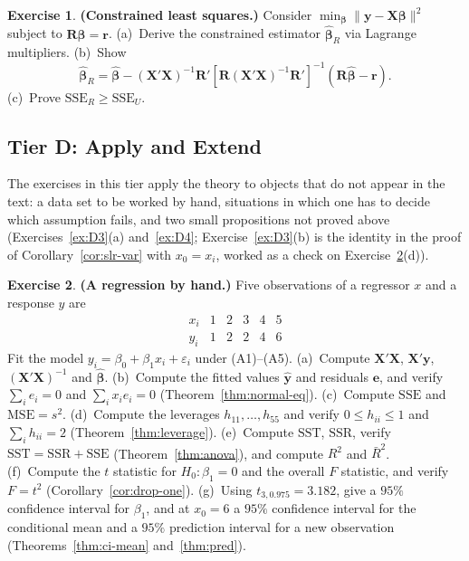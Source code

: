 \documentclass[12pt,a4paper]{article}
\theoremstyle{definition}
\newtheorem{exercise}{Exercise}
\newcommand{\extier}{}
\newcommand{\exercisetier}[1]{\renewcommand{\extier}{#1}\setcounter{exercise}{0}}
\newcommand{\SST}{\mathrm{SST}}
\newcommand{\SSR}{\mathrm{SSR}}
\newcommand{\SSE}{\mathrm{SSE}}
\newcommand{\MSE}{\mathrm{MSE}}
\newcommand{\bX}{\mathbf{X}}
\newcommand{\by}{\mathbf{y}}
\def\bb{\boldsymbol{\beta}}
\newcommand{\bR}{\mathbf{R}}
\newcommand{\br}{\mathbf{r}}
\begin{document}
\begin{exercise}\label{ex:C4}
\textbf{(Constrained least squares.)} Consider $\min_{\bb}\|\by - \bX\bb\|^2$ subject to $\bR\bb = \br$. (a)~Derive the constrained estimator $\hat{\bb}_R$ via Lagrange multipliers. (b)~Show
\[
\hat{\bb}_R = \hat{\bb} - (\bX'\bX)^{-1}\bR'[\bR(\bX'\bX)^{-1}\bR']^{-1}(\bR\hat{\bb} - \br).
\]
(c)~Prove $\SSE_R \geqslant \SSE_U$.
\end{exercise}

\exercisetier{D}
\subsection*{Tier D: Apply and Extend}

The exercises in this tier apply the theory to objects that do not appear in the text: a data set to be worked by hand, situations in which one has to decide which assumption fails, and two small propositions not proved above (Exercises~\ref{ex:D3}(a) and~\ref{ex:D4}; Exercise~\ref{ex:D3}(b) is the identity in the proof of Corollary~\ref{cor:slr-var} with $x_0 = x_i$, worked as a check on Exercise~\ref{ex:D1}(d)).

\begin{exercise}\label{ex:D1}
\textbf{(A regression by hand.)} Five observations of a regressor $x$ and a response $y$ are
\[
\begin{array}{c|ccccc}
x_i & 1 & 2 & 3 & 4 & 5\\ \hline
y_i & 1 & 2 & 2 & 4 & 6
\end{array}
\]
Fit the model $y_i = \beta_0 + \beta_1 x_i + \varepsilon_i$ under (A1)--(A5). (a)~Compute $\bX'\bX$, $\bX'\by$, $(\bX'\bX)^{-1}$ and $\hat{\bb}$. (b)~Compute the fitted values $\hat{\by}$ and residuals $\mathbf{e}$, and verify $\sum_i e_i = 0$ and $\sum_i x_i e_i = 0$ (Theorem~\ref{thm:normal-eq}). (c)~Compute $\SSE$ and $\MSE = s^2$. (d)~Compute the leverages $h_{11}, \ldots, h_{55}$ and verify $0 \leqslant h_{ii} \leqslant 1$ and $\sum_i h_{ii} = 2$ (Theorem~\ref{thm:leverage}). (e)~Compute $\SST$, $\SSR$, verify $\SST = \SSR + \SSE$ (Theorem~\ref{thm:anova}), and compute $R^2$ and $\bar{R}^2$. (f)~Compute the $t$ statistic for $H_0\colon \beta_1 = 0$ and the overall $F$ statistic, and verify $F = t^2$ (Corollary~\ref{cor:drop-one}). (g)~Using $t_{3,0.975} = 3.182$, give a $95\%$ confidence interval for $\beta_1$, and at $x_0 = 6$ a $95\%$ confidence interval for the conditional mean and a $95\%$ prediction interval for a new observation (Theorems~\ref{thm:ci-mean} and~\ref{thm:pred}).
\end{exercise}
\end{document}
